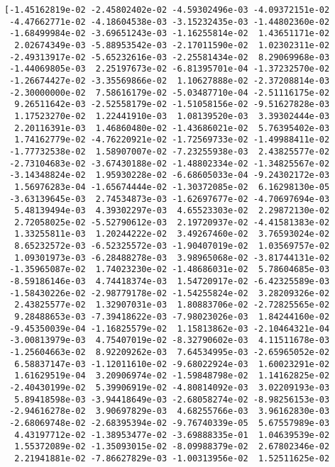 \documentclass[11pt]{article}
\begin{document}
    \begin{Verbatim}[commandchars=\\\{\}]
[-1.45162819e-02 -2.45802402e-02 -4.59302496e-03 -4.09372151e-02
 -4.47662771e-02 -4.18604538e-03 -3.15232435e-03 -1.44802360e-02
 -1.68499984e-02 -3.69651243e-03 -1.16255814e-02  1.43651171e-02
  2.02674349e-03 -5.88953542e-03 -2.17011590e-02  1.02302311e-02
 -2.49313917e-02 -5.65232616e-03 -2.25581434e-02  8.29069968e-03
 -1.44069805e-03  2.25197673e-02 -6.81395701e-04 -1.37232570e-02
 -1.26674427e-02 -3.35569866e-02  1.10627888e-02 -2.37208814e-03
 -2.30000000e-02  7.58616179e-02 -5.03487710e-04 -2.51116175e-02
  9.26511642e-03 -2.52558179e-02 -1.51058156e-02 -9.51627828e-03
  1.17523270e-02  1.22441910e-03  1.08139520e-03  3.39302444e-03
  2.20116391e-03  1.46860480e-02 -1.43686021e-02  5.76395402e-03
  1.74162779e-02 -4.76220921e-02 -1.72569733e-02 -1.49988411e-02
 -1.77732538e-02  1.58907007e-02 -7.23255938e-03  2.43825577e-02
 -2.73104683e-02 -3.67430188e-02 -1.48802334e-02 -1.34825567e-02
 -3.14348824e-02  1.95930228e-02 -6.68605033e-04 -9.24302172e-03
  1.56976283e-04 -1.65674444e-02 -1.30372085e-02  6.16298130e-05
 -3.63139645e-03  2.74534873e-03 -1.62697677e-02 -4.70697694e-03
  5.48139494e-03  4.39302297e-03  4.65523303e-02  2.29872130e-02
  2.72058025e-02 -5.52790612e-03  2.19720937e-02 -4.41581383e-02
  1.33255811e-03  1.20244222e-02  3.49267460e-02  3.76593024e-02
  8.65232572e-03 -6.52325572e-03 -1.90407019e-02  1.03569757e-02
  1.09301973e-03 -6.28488278e-03  3.98965068e-02 -3.81744131e-02
 -1.35965087e-02  1.74023230e-02 -1.48686031e-02  5.78604685e-03
 -8.59186146e-03  4.74418374e-03  1.54720917e-02 -6.42325589e-03
 -1.58430226e-02 -2.98779178e-02 -1.54255824e-02  3.28209326e-02
  2.43825577e-02  1.32907031e-03  1.80883706e-02 -2.72825565e-02
  9.28488653e-03 -7.39418622e-03 -7.98023026e-03  1.84244160e-02
 -9.45350039e-04 -1.16825579e-02  1.15813862e-03 -2.10464321e-04
 -3.00813979e-03  4.75407019e-02 -8.32790602e-03  4.11511678e-03
 -1.25604663e-02  8.92209262e-03  7.64534995e-03 -2.65965052e-02
  6.58837147e-03 -1.12011610e-02 -9.68022924e-03  1.60023291e-02
  1.61629519e-04  3.20906974e-02 -1.59848798e-02  1.14162825e-02
 -2.40430199e-02  5.39906919e-02 -4.80814092e-03  3.02209193e-03
  5.89418598e-03 -3.94418649e-03 -2.68058274e-02 -8.98256153e-03
 -2.94616278e-02  3.90697829e-03  4.68255766e-03  3.96162830e-03
 -2.68069748e-02 -2.68395394e-02 -9.76740339e-05  5.67557989e-03
  4.43197712e-02 -1.38953477e-02 -3.69888335e-01  1.04639539e-02
  1.55372089e-02 -1.35093015e-02 -8.09988379e-02  2.67802346e-02
  2.21941881e-02 -7.86627829e-03 -1.00313956e-02  1.52511625e-02

\end{Verbatim}
\end{document}
